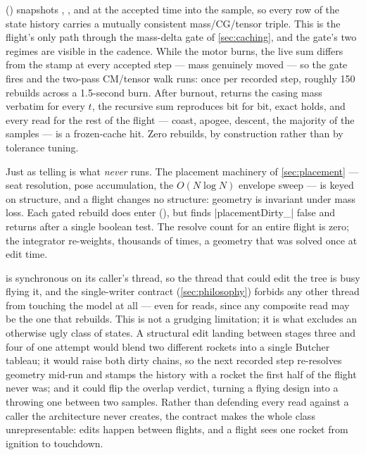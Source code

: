  () snapshots
, , and  at the accepted time into the
 sample, so every row of the state history carries a mutually consistent
mass/CG/tensor triple. This is the flight's only path through the mass-delta gate of
\cref{sec:caching}, and the gate's two regimes are visible in the cadence. While the motor burns,
the live sum differs from the stamp at every accepted step --- mass genuinely moved --- so the
gate fires and the two-pass CM/tensor walk runs: once per recorded step, roughly 150 rebuilds
across a 1.5-second burn. After burnout,  returns the casing mass
verbatim for every $t$, the recursive sum reproduces bit for bit, exact \code{==} holds, and
every read for the rest of the flight --- coast, apogee, descent, the majority of the samples ---
is a frozen-cache hit. Zero rebuilds, by construction rather than by tolerance tuning.

Just as telling is what \emph{never} runs. The placement machinery of \cref{sec:placement} ---
seat resolution, pose accumulation, the $O(N \log N)$ envelope sweep --- is keyed on structure,
and a flight changes no structure: geometry is invariant under mass loss. Each gated rebuild does
enter  (), but finds
\cppinline|placementDirty_| false and returns after a single boolean test. The resolve count for
an entire flight is zero; the integrator re-weights, thousands of times, a geometry that was
solved once at edit time.

\begin{designrule}
 is synchronous on its caller's thread, so the thread that could edit
the tree is busy flying it, and the single-writer contract (\cref{sec:philosophy}) forbids any
other thread from touching the model at all --- even for  reads, since any composite
read may be the one that rebuilds. This is not a grudging limitation; it is what excludes an
otherwise ugly class of states. A structural edit landing between stages three and four of one
attempt would blend two different rockets into a single Butcher tableau; it would raise both
dirty chains, so the next recorded step re-resolves geometry mid-run and stamps the history with
a rocket the first half of the flight never was; and it could flip the overlap verdict, turning a
flying design into a throwing one between two samples. Rather than defending every read
against a caller the architecture never creates, the contract makes the whole class
unrepresentable: edits happen between flights, and a flight sees one rocket from ignition to
touchdown.
\end{designrule}

